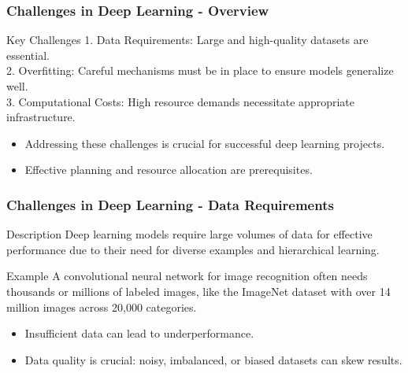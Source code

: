 \documentclass[aspectratio=169]{beamer}
\begin{document}
\begin{frame}[fragile]
    \frametitle{Challenges in Deep Learning - Overview}
    \begin{block}{Key Challenges}
        1. Data Requirements: Large and high-quality datasets are essential.\\
        2. Overfitting: Careful mechanisms must be in place to ensure models generalize well.\\
        3. Computational Costs: High resource demands necessitate appropriate infrastructure.
    \end{block}
    \begin{itemize}
        \item Addressing these challenges is crucial for successful deep learning projects.
        \item Effective planning and resource allocation are prerequisites.
    \end{itemize}
\end{frame}

\begin{frame}[fragile]
    \frametitle{Challenges in Deep Learning - Data Requirements}
    \begin{block}{Description}
        Deep learning models require large volumes of data for effective performance due to their need for diverse examples and hierarchical learning.
    \end{block}
    \begin{exampleblock}{Example}
        A convolutional neural network for image recognition often needs thousands or millions of labeled images, like the ImageNet dataset with over 14 million images across 20,000 categories.
    \end{exampleblock}
    \begin{itemize}
        \item Insufficient data can lead to underperformance.
        \item Data quality is crucial: noisy, imbalanced, or biased datasets can skew results.
    \end{itemize}
\end{frame}
\end{document}
